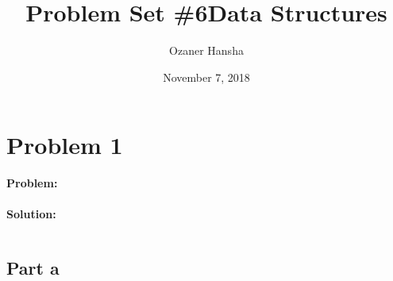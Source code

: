 \documentclass{article}
\begin{document}
\title{Problem Set \#6}
\title{Data Structures}
\author{Ozaner Hansha}
\date{November 7, 2018}
\maketitle

\section*{Problem 1}
\textbf{Problem:}
\\\\
\textbf{Solution:}
\begin{lstlisting}[language=Java]

\end{lstlisting}

\subsection*{Part a}
\end{document}
